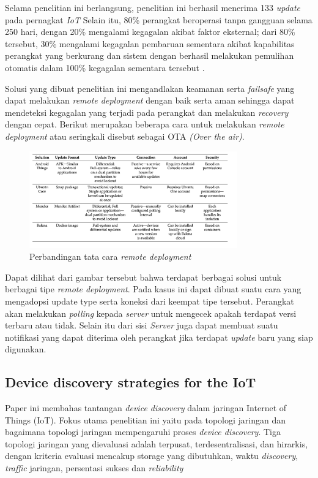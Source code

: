 Selama penelitian ini berlangsung, penelitian ini berhasil menerima 133 \textit{update} pada pernagkat \textit{IoT} Selain itu, 80\% perangkat beroperasi tanpa gangguan selama 250 hari, dengan 20\% mengalami kegagalan akibat faktor eksternal; dari 80\% tersebut, 30\% mengalami kegagalan pembaruan sementara akibat kapabilitas perangkat yang berkurang dan sistem dengan berhasil melakukan pemulihan otomatis dalam 100\% kegagalan sementara tersebut \parencite{RemoteDeployment}.

Solusi yang dibuat penelitian ini mengandlakan keamanan serta \textit{failsafe} yang dapat melakukan \textit{remote deployment} dengan baik serta aman sehingga dapat mendeteksi kegagalan yang terjadi pada perangkat dan melakukan \textit{recovery} dengan cepat. Berikut merupakan beberapa cara untuk melakukan \textit{remote deployment} atau seringkali disebut sebagai OTA \textit{(Over the air)}.


\begin{figure}[h]
  \centering
  \includegraphics[width=0.8\textwidth]{resources/chapter-2/perbandingan-remote-deployment.jpg}
  \caption{Perbandingan tata cara \textit{remote deployment} \parencite{RemoteDeployment}}
  \label{fig:comparison-remote-deployments}
\end{figure}

Dapat dilihat dari gambar tersebut bahwa terdapat berbagai solusi untuk berbagai tipe \textit{remote deployment}. Pada kasus ini dapat dibuat suatu cara yang mengadopsi update type serta koneksi dari keempat tipe tersebut. Perangkat akan melakukan \textit{polling} kepada \textit{server} untuk mengecek apakah terdapat versi terbaru atau tidak. Selain itu dari sisi \textit{Server} juga dapat membuat suatu notifikasi yang dapat diterima oleh perangkat jika terdapat \textit{update} baru yang siap digunakan.


\subsection{Device discovery strategies for the IoT}
Paper ini membahas tantangan \textit{device discovery} dalam jaringan Internet of Things (IoT). Fokus utama penelitian ini yaitu pada topologi jaringan dan bagaimana topologi jaringan mempengaruhi proses \textit{device discovery}. Tiga topologi jaringan yang dievaluasi adalah terpusat, terdesentralisasi, dan hirarkis, dengan kriteria evaluasi mencakup storage yang dibutuhkan, waktu \textit{discovery}, \textit{traffic} jaringan, persentasi sukses dan \textit{reliability}

